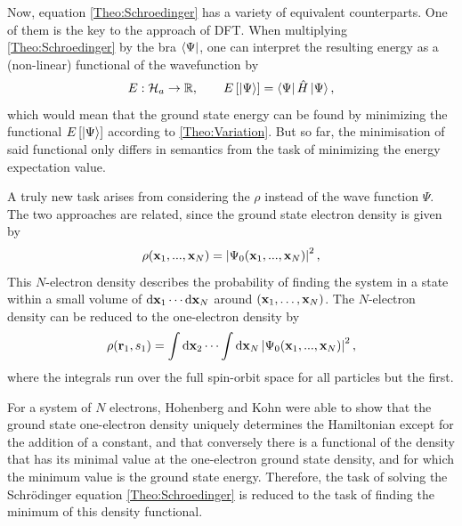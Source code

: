\documentclass[8.5pt,twoside,twocolumn]{article}
\renewcommand\Hil{\enmat{\mathcal H_a}}
\newcommand\di{\te{d}}
\renewcommand\r{\bo r}
\theoremstyle{standard}
\begin{document}
Now, equation \eqref{Theo:Schroedinger} has a variety of equivalent counterparts. One of them
is the key to the approach of DFT. When multiplying \eqref{Theo:Schroedinger} by the bra $\left\langle\Psi{}\right|$,
one can interpret the resulting energy as a (non-linear) functional of the wavefunction by
\begin{equation}
 E : \Hil \rar \R, \qquad E\ed{\keP{}}=\brP{} \Ha \keP{},
 \label{Theo:WaveFunctional}
\end{equation}
which would mean that the ground state energy can be found by minimizing the functional
$E\left[{\left|\Psi{}\right\rangle}\right]$ according to \eqref{Theo:Variation}. But so far, the minimisation
of said functional only differs in semantics from the task of minimizing the energy expectation value.

A truly new task arises from considering the  $\rho$ instead of the wave function
$\Psi$. The two approaches are related, since the ground state electron density is given by
\begin{equation}
 \rho(\mathbf{x}_1,...,\mathbf{x}_N)=\left|{\Psi_0(\mathbf{x}_1,...,\mathbf{x}_N)}\right|^2,
 \label{Theo:NElectronDensity}
\end{equation}
This $N$-electron density describes the probability of finding the system in a state within 
a small volume of $\di \x_1 \cdots \di \x_N$ around $(\mathbf{x}_1,\ldots,\mathbf{x}_N)$. 
The $N$-electron density can be reduced to the one-electron density by
\begin{equation}
 \rho(\r_1,s_1)=\int\di\x_2 \cdots \int\di \x_N \abs{\Psi_0(\x_1,...,\x_N)}^2,
 \label{Theo:1ElectronDensity}
\end{equation}
where the integrals run over %
the full spin-orbit space for all particles but the first.

For a system of $N$ electrons, Hohenberg and Kohn \cite{HohenbergKohn} were able to show that the ground state
one-electron density uniquely determines the Hamiltonian except for the addition of a constant,
and that conversely there is a functional of the density that has its minimal value at the one-electron
ground state density, and for which the minimum value is the ground state energy. Therefore, the task
of solving the Schrödinger equation \eqref{Theo:Schroedinger} is reduced to the task of finding
the minimum of this density functional.
\end{document}
